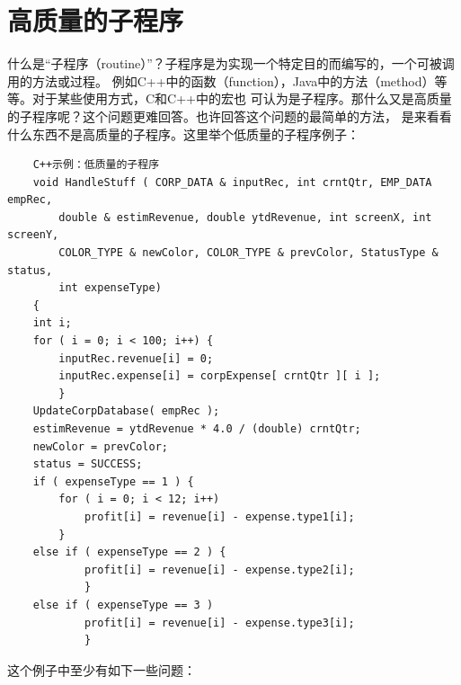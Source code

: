 \documentclass{article}
\begin{document}
\section{高质量的子程序}
什么是“子程序（routine）”？子程序是为实现一个特定目的而编写的，一个可被调用的方法或过程。
例如C++中的函数（function），Java中的方法（method）等等。对于某些使用方式，C和C++中的宏也
可认为是子程序。那什么又是高质量的子程序呢？这个问题更难回答。也许回答这个问题的最简单的方法，
是来看看什么东西不是高质量的子程序。这里举个低质量的子程序例子：
\begin{lstlisting}
    C++示例：低质量的子程序
    void HandleStuff ( CORP_DATA & inputRec, int crntQtr, EMP_DATA empRec,
        double & estimRevenue, double ytdRevenue, int screenX, int screenY,
        COLOR_TYPE & newColor, COLOR_TYPE & prevColor, StatusType & status,
        int expenseType)
    {
    int i;
    for ( i = 0; i < 100; i++) {
        inputRec.revenue[i] = 0;
        inputRec.expense[i] = corpExpense[ crntQtr ][ i ];
        }
    UpdateCorpDatabase( empRec );
    estimRevenue = ytdRevenue * 4.0 / (double) crntQtr;
    newColor = prevColor;
    status = SUCCESS;
    if ( expenseType == 1 ) {
        for ( i = 0; i < 12; i++)
            profit[i] = revenue[i] - expense.type1[i];
        }
    else if ( expenseType == 2 ) {
            profit[i] = revenue[i] - expense.type2[i];
            }
    else if ( expenseType == 3 ) 
            profit[i] = revenue[i] - expense.type3[i];
            }
\end{lstlisting}
这个例子中至少有如下一些问题：
\end{document}
